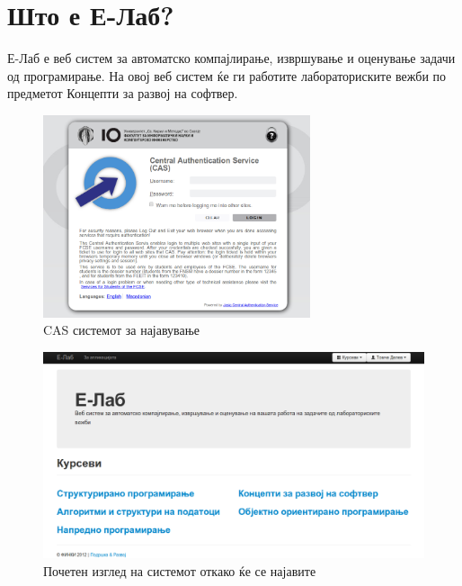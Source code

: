 

\chead{}
\lfoot{}
\cfoot{\thepage}
\rfoot{}
\usepackage{fancyvrb}
\usepackage{xcolor}
\usepackage{textcomp}




\section{Што е Е-Лаб?}

Е-Лаб е веб систем за автоматско компајлирање, извршување и оценување задачи
од програмирање. На овој веб систем ќе ги работите лабораториските вежби по
предметот Концепти за развој на софтвер.


\begin{figure}[htbp]
\centering
\includegraphics[width=0.7\textwidth]{images/elab/cas}
\caption{CAS системот за најавување}
\end{figure}

\begin{figure}[htbp]
\centering
\includegraphics[width=\textwidth]{images/elab/main}
\caption{Почетен изглед на системот откако ќе се најавите}
\end{figure}

